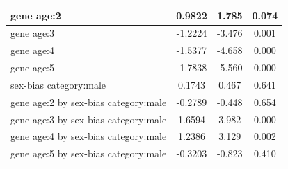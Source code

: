 \documentclass{article}
\begin{document}
\begin{table}[H]
\begin{tabular}{l |c |c | c}
        \hline
        gene age:2 &  0.9822 &  1.785 & 0.074\\
        \hline
        gene age:3 & -1.2224 & -3.476 & 0.001\\
        \hline
        gene age:4 & -1.5377 & -4.658 & 0.000\\
        \hline
        gene age:5 & -1.7838 & -5.560 & 0.000\\
        \hline
        sex-bias category:male & 0.1743 &  0.467 & 0.641\\
        \hline
        gene age:2 by sex-bias category:male & -0.2789 & -0.448 & 0.654\\
        \hline
        gene age:3 by sex-bias category:male &  1.6594 &  3.982 & 0.000\\
        \hline
        gene age:4 by sex-bias category:male &  1.2386 &  3.129 & 0.002\\
        \hline
        gene age:5 by sex-bias category:male & -0.3203 & -0.823 & 0.410\\
        \hline
    \end{tabular}
\end{table}
\end{document}
